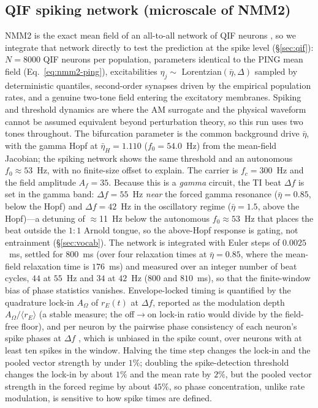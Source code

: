 \documentclass[11pt,a4paper]{article}
\begin{document}
\subsection{QIF spiking network (microscale of NMM2)}\label{sec:qif-methods}
NMM2 is the exact mean field of an all-to-all network of QIF neurons
\cite{montbrio2015,ruffini2025rosetta,clusella2023}, so we integrate that network directly
to test the prediction at the spike level (\S\ref{sec:qif}): $N=8000$ QIF neurons per
population, parameters identical to the PING mean field (Eq.~\eqref{eq:nmm2-ping}),
excitabilities $\eta_j\sim$ Lorentzian$(\bar\eta,\Delta)$ sampled by deterministic
quantiles, second-order synapses driven by the empirical population rates, and a genuine
two-tone field entering the excitatory membranes. Spiking and threshold dynamics are
where the AM surrogate and the physical waveform cannot be assumed equivalent beyond
perturbation theory, so this run uses two tones throughout. The bifurcation parameter is the common
background drive $\bar\eta$, with the gamma Hopf at $\bar\eta_H=1.110$ ($f_0=54.0$~Hz)
from the mean-field Jacobian; the spiking network shows the same threshold and an
autonomous $f_0\!\approx\!53$~Hz, with no finite-size offset to explain. The carrier is
$f_c=300$~Hz and the field amplitude $A_f=35$. Because
this is a \emph{gamma} circuit, the TI beat $\Delta f$ is set in the gamma band:
$\Delta f=55$~Hz \emph{near} the forced gamma resonance ($\bar\eta=0.85$, below the Hopf) and
$\Delta f=42$~Hz in the oscillatory regime ($\bar\eta=1.5$, above the Hopf)---a detuning of
$\approx$11~Hz below the autonomous $f_0\!\approx\!53$~Hz that places the beat outside the
$1{:}1$ Arnold tongue, so the above-Hopf response is gating, not entrainment
(\S\ref{sec:vocab}). The network is integrated with Euler steps of $0.0025$~ms, settled for $800$~ms (over
four relaxation times at $\bar\eta=0.85$, where the mean-field relaxation time is
$176$~ms) and measured over an integer number of beat cycles, $44$ at $55$~Hz and $34$ at
$42$~Hz ($800$ and $810$~ms), so that the finite-window bias of phase statistics
vanishes. Envelope-locked timing is quantified by the quadrature lock-in $A_\Omega$ of
$r_E(t)$ at $\Delta f$, reported as the modulation depth $A_\Omega/\langle r_E\rangle$ (a
stable measure; the off$\to$on lock-in ratio would divide by the field-free floor), and
per neuron by the pairwise phase consistency of each neuron's spike phases at $\Delta f$
\cite{vinck2010}, which is unbiased in the spike count, over neurons with at least ten
spikes in the window. Halving the time step changes the lock-in and the pooled vector
strength by under $1\%$; doubling the spike-detection threshold changes the lock-in by
about $1\%$ and the mean rate by $2\%$, but the pooled vector strength in the forced
regime by about $45\%$, so phase concentration, unlike rate modulation, is sensitive to
how spike times are defined.
\end{document}
